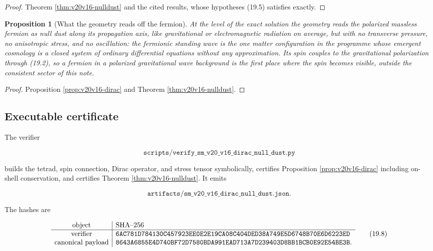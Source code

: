 \documentclass[11pt]{article}
\newtheorem{proposition}[theorem]{Proposition}
\theoremstyle{remark}
\begin{document}
\begin{proof}
Theorem \ref{thm:v20v16-nulldust} and the cited results, whose
hypotheses (19.5) satisfies exactly.
\end{proof}

\begin{proposition}[What the geometry reads off the fermion]
\label{prop:v20v16-reading}
At the level of the exact solution the geometry reads the polarized
massless fermion as null dust along its propagation axis, like
gravitational or electromagnetic radiation on average, but with no
transverse pressure, no anisotropic stress, and no oscillation: the
fermionic standing wave is the one matter configuration in the
programme whose emergent cosmology is a closed system of ordinary
differential equations without any approximation.  Its spin couples
to the gravitational polarization through (19.2), so a fermion in a
polarized gravitational wave background is the first place where the
spin becomes visible, outside the consistent sector of this note.
\end{proposition}

\begin{proof}
Proposition \ref{prop:v20v16-dirac} and Theorem \ref{thm:v20v16-nulldust}.
\end{proof}

\subsection{Executable certificate}

The verifier

\[
 \texttt{scripts/verify\_sm\_v20\_v16\_dirac\_null\_dust.py}          \tag{19.6}
\]

builds the tetrad, spin connection, Dirac operator, and stress
tensor symbolically, certifies Proposition \ref{prop:v20v16-dirac}
including on-shell conservation, and certifies Theorem
\ref{thm:v20v16-nulldust}.  It emits

\[
 \texttt{artifacts/sm\_v20\_v16\_dirac\_null\_dust.json}.             \tag{19.7}
\]

The hashes are

\[
\begin{array}{c|l}
\hbox{object}&\hbox{SHA--256}\\ \hline
\hbox{verifier}&
\texttt{6AC781D784130C457923EE0E2E19CA08C404DED38A749E5D6748B70E6D6223ED}\\
\hbox{canonical payload}&
\texttt{8643A6855E4D740BF72D7580BDA991EAD713A7D239403D8BB1BCB0E92E54BE3B}.
\end{array}                                                     \tag{19.8}
\]
\end{document}
